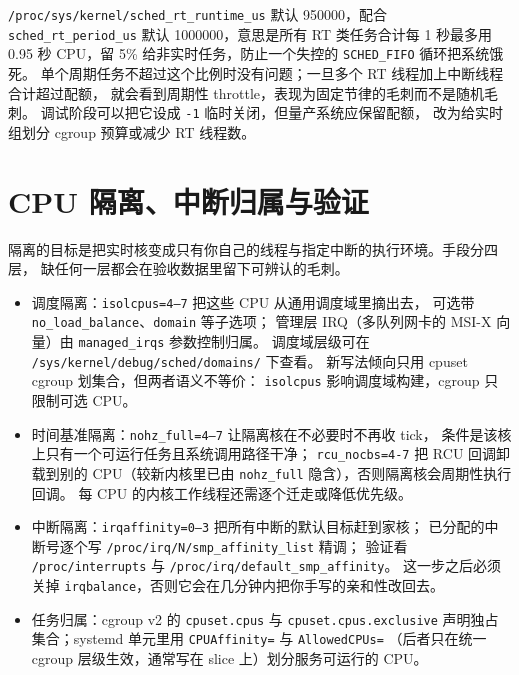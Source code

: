 \documentclass[12pt,a4paper,fontset=fandol]{ctexbook}
\newcommand{\Tp}[1]{\texttt{#1}}
\newcommand{\Bk}{\discretionary{}{}{}}
\begin{document}
\begin{note}[title={全局实时配额会把高优先级任务掐掉}]
\Tp{/proc/sys/kernel/sched\_rt\_runtime\_us} 默认 950000，配合
\Tp{sched\_rt\_period\_us} 默认 1000000，意思是所有 RT 类任务合计每 1 秒最多用
0.95 秒 CPU，留 5\% 给非实时任务，防止一个失控的 \Tp{SCHED\_FIFO} 循环把系统饿死。
单个周期任务不超过这个比例时没有问题；一旦多个 RT 线程加上中断线程合计超过配额，
就会看到周期性 throttle，表现为固定节律的毛刺而不是随机毛刺。
调试阶段可以把它设成 \Tp{-1} 临时关闭，但量产系统应保留配额，
改为给实时组划分 cgroup 预算或减少 RT 线程数。
\end{note}

\section{CPU 隔离、中断归属与验证}
\label{sec:ch08-isolation}

隔离的目标是把实时核变成只有你自己的线程与指定中断的执行环境。手段分四层，
缺任何一层都会在验收数据里留下可辨认的毛刺。

\begin{itemize}
  \item 调度隔离：\Tp{isolcpus=4--{\Bk}7} 把这些 CPU 从通用调度域里摘出去，
        可选带 \Tp{no\_{\Bk}load\_{\Bk}balance}、\Tp{domain} 等子选项；
        管理层 IRQ（多队列网卡的 MSI-X 向量）由 \Tp{managed\_{\Bk}irqs} 参数控制归属。
        调度域层级可在 \Tp{/sys/kernel/debug/sched/domains/} 下查看。
        新写法倾向只用 cpuset cgroup 划集合，但两者语义不等价：
        \Tp{isolcpus} 影响调度域构建，cgroup 只限制可选 CPU。
  \item 时间基准隔离：\Tp{nohz\_{\Bk}full=4--{\Bk}7} 让隔离核在不必要时不再收 tick，
        条件是该核上只有一个可运行任务且系统调用路径干净；
        \Tp{rcu\_nocbs=4-7} 把 RCU 回调卸载到别的 CPU（较新内核里已由
        \Tp{nohz\_full} 隐含），否则隔离核会周期性执行回调。
        每 CPU 的内核工作线程还需逐个迁走或降低优先级。
  \item 中断隔离：\Tp{irqaffinity=0--{\Bk}3} 把所有中断的默认目标赶到家核；
        已分配的中断号逐个写 \Tp{/proc/irq/N/smp\_{\Bk}affinity\_{\Bk}list} 精调；
        验证看 \Tp{/proc/interrupts} 与 \Tp{/proc/irq/default\_{\Bk}smp\_{\Bk}affinity}。
        这一步之后必须关掉 \Tp{irqbalance}，否则它会在几分钟内把你手写的亲和性改回去。
  \item 任务归属：cgroup v2 的 \Tp{cpuset.cpus} 与 \Tp{cpuset.cpus.exclusive}
        声明独占集合；systemd 单元里用 \Tp{CPUAffinity=} 与 \Tp{AllowedCPUs=}
        （后者只在统一 cgroup 层级生效，通常写在 slice 上）划分服务可运行的 CPU。
\end{itemize}
\end{document}
